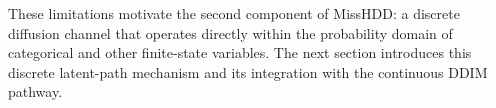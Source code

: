\documentclass[times, review, 10pt]{elsarticle}
\newcommand{\DIFaddbegin}{\begingroup\color{blue}}
\newcommand{\DIFaddend}{\endgroup}
\begin{document}
These limitations motivate the second component of MissHDD: a discrete
diffusion channel that operates directly within the probability domain of
categorical and other finite-state variables. The next section introduces
this discrete latent-path mechanism and its integration with the continuous
DDIM pathway.




\DIFaddbegin
\DIFaddend
\end{document}
